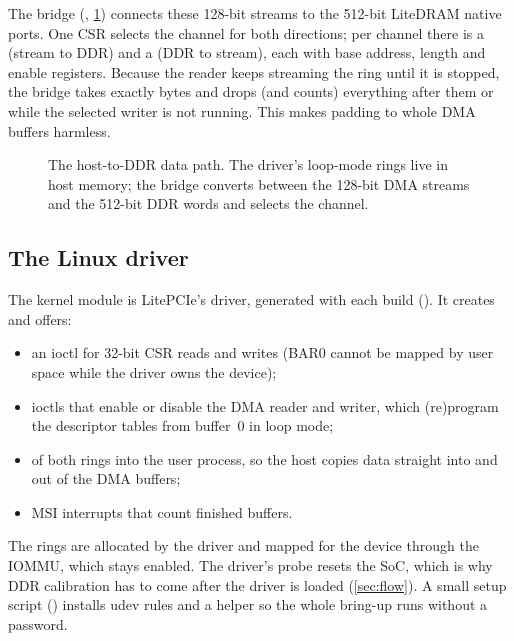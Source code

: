 The bridge (, \cref{fig:pcie_dma}) connects these 128-bit streams to the 512-bit
LiteDRAM native ports. One CSR selects the channel for both directions; per channel there is a
 (stream to DDR) and a  (DDR to stream), each with base address,
length and enable registers. Because the reader keeps streaming the ring until it is stopped, the bridge takes exactly
 bytes and drops (and counts) everything after them or while the selected writer is not running. This
makes padding to whole DMA buffers harmless.

\begin{figure}[t]
  \centering
  \resizebox{\linewidth}{!}{}
  \caption{The host-to-DDR data path. The driver's loop-mode rings live in host memory; the bridge converts between
    the 128-bit DMA streams and the 512-bit DDR words and selects the channel.}
  \label{fig:pcie_dma}
\end{figure}

\subsection{The Linux driver}
The kernel module is LitePCIe's driver, generated with each build (). It creates
 and offers:
\begin{itemize}
  \item an ioctl for 32-bit CSR reads and writes (BAR0 cannot be mapped by user space while the driver owns the
        device);
  \item ioctls that enable or disable the DMA reader and writer, which (re)program the descriptor tables from buffer~0
        in loop mode;
  \item {} of both rings into the user process, so the host copies data straight into and out of the DMA
        buffers;
  \item MSI interrupts that count finished buffers.
\end{itemize}
The rings are allocated by the driver and mapped for the device through the IOMMU, which stays enabled. The
driver's probe resets the SoC, which is why DDR calibration has to come after the driver is loaded
(\cref{sec:flow}). A small setup script () installs udev rules and a helper so
the whole bring-up runs without a password.

